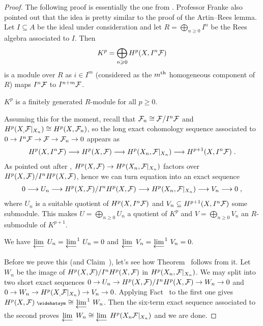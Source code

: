 \documentclass[a4paper,parskip=half,numbers=enddot, DIV=12]{scrreprt}
\renewcommand{\geq}{\geqslant}
\begin{document}
\begin{proof}
	The following proof is essentially the one from \cite[Ch.\:III (4.1.7)]{egaIII}. Professor Franke also pointed out that the idea is pretty similar to the proof of the Artin--Rees lemma. Let $I\subseteq A$ be the ideal under consideration and let $R=\bigoplus_{n\geq 0}I^n$ be the Rees algebra associated to $I$. Then
	\begin{align*}
		K^p=\bigoplus_{n\geq 0}H^p(X,I^n\Ff)
	\end{align*}
	is a module over $R$ as $i\in I^m$ (considered as the $m^{\text{th}}$ homogeneous component of $R$) maps $I^n\mathcal{F}$ to $I^{n+m}\mathcal{F}$.
	\begin{claim}
		$K^p$ is a finitely generated $R$-module for all $p\geq 0$.
	\end{claim}
	Assuming this for the moment, recall that $\mathcal{F}_n\cong \mathcal{F}/I^n\mathcal{F}$ and $H^p(X_,\mathcal{F}|_{X_n})\cong H^p(X,\mathcal{F}_n)$, so the long exact cohomology sequence associated to $0\morphism I^n\Ff\morphism \Ff\morphism \Ff_n\morphism 0$ appears as
	\begin{align}\lbl{eq:FFSeq1}
		H^p(X,I^n\Ff)\morphism H^p(X,\Ff)\morphism H^p(X_n,\Ff|_{X_n})\morphism H^{p+1}(X,I^n\Ff)\;.
	\end{align}
	As pointed out after , $H^p(X,\Ff)\morphism H^p(X_n,\Ff|_{X_n})$ factors over $H^p(X,\mathcal{F})/I^nH^p(X,\mathcal{F})$, hence we can turn equation  into an exact sequence
	\begin{align}\lbl{eq:FFSeq2}
		0\morphism U_n\morphism H^p(X,\Ff)/I^nH^p(X,\Ff)\morphism H^p(X_n,\Ff|_{X_n})\morphism V_n\morphism 0\;,
	\end{align}
	where $U_n$ is a suitable quotient of $H^p(X,I^n\mathcal{F})$ and $V_n\subseteq H^{p+1}(X,I^n\mathcal{F})$ some submodule. This makes $U=\bigoplus_{n\geq 0}U_n$ a quotient of $K^p$ and $V=\bigoplus_{n\geq 0}V_n$ an $R$-submodule of $K^{p+1}$.
	\begin{claim}
		We have $\limit U_n=\limit[][^1]U_n=0$ and $\limit V_n=\limit[][^1]V_n=0$.
	\end{claim}
	Before we prove this (and Claim~), let's see how Theorem~ follows from it. Let $W_n$ be the image of $H^p(X,\mathcal{F})/I^nH^p(X,\mathcal{F})$ in $H^p(X_n,\mathcal{F}|_{X_n})$. We may split  into two short exact sequences $0\morphism U_n\morphism H^p(X,\Ff)/I^nH^p(X,\Ff)\morphism W_n\morphism 0$ and $0\morphism W_n\morphism H^p(X_,\Ff|_{X_n})\morphism V_n\morphism 0$. Applying Fact~ to the first one gives $H^p(X,\Ff)^\complete\cong \limit[][^1]W_n$. Then the six-term exact sequence associated to the second proves $\limit W_n\cong \limit H^p(X_n\Ff|_{X_n})$ and we are done.
	

\end{proof}
\end{document}
